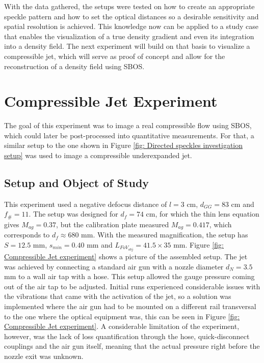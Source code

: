With the data gathered, the setups were tested on how to create an appropriate speckle pattern and how to set the optical distances so a desirable sensitivity and spatial resolution is achieved. This knowledge now can be applied to a study case that enables the visualization of a true density gradient and even its integration into a density field. The next experiment will build on that basis to visualize a compressible jet, which will serve as proof of concept and allow for the reconstruction of a density field using SBOS.

\section{Compressible Jet Experiment}
\label{section: Compressible jet experiment}

The goal of this experiment was to image a real compressible flow using SBOS, which could later be post-processed into quantitative measurements. For that, a similar setup to the one shown in Figure \ref{fig: Directed speckles investigation setup} was used to image a compressible underexpanded jet.

\subsection{Setup and Object of Study}
\label{subsection: jet setup}

This experiment used a negative defocus distance of $l = 3$ cm, $d_{GG} = 83$ cm and $f_\# = 11$. The setup was designed for $d_f = 74$ cm, for which the thin lens equation gives $M_{ag} = 0.37$, but the calibration plate measured $M_{ag} = 0.417$, which corresponds to $d_f \approx 680$ mm. With the measured magnification, the setup has $S = 12.5$ mm, $s_{min} = 0.40$ mm and $L_{FoV_{obj}} = 41.5 \times 35$ mm. Figure \ref{fig: Compressible Jet experiment} shows a picture of the assembled setup. The jet was achieved by connecting a standard air gun with a nozzle diameter $d_N = 3.5$ mm to a wall air tap with a hose. This setup allowed the gauge pressure coming out of the air tap to be adjusted. Initial runs experienced considerable issues with the vibrations that came with the activation of the jet, so a solution was implemented where the air gun had to be mounted on a different rail transversal to the one where the optical equipment was, this can be seen in Figure \ref{fig: Compressible Jet experiment}. A considerable limitation of the experiment, however, was the lack of loss quantification through the hose, quick-disconnect couplings and the air gun itself, meaning that the actual pressure right before the nozzle exit was unknown.

